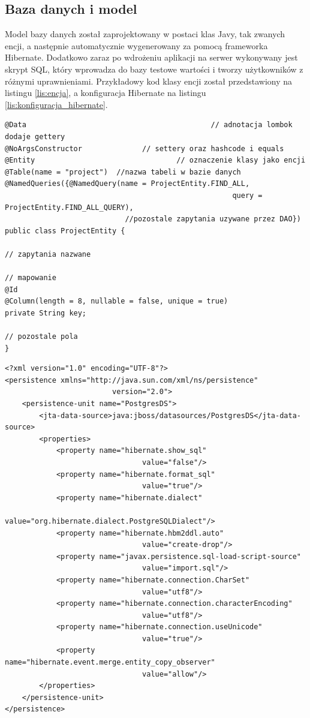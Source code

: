 \subsection{Baza danych i model}
Model bazy danych został zaprojektowany w postaci klas Javy, tak zwanych encji, a następnie automatycznie wygenerowany za pomocą frameworka Hibernate. Dodatkowo zaraz po wdrożeniu aplikacji na serwer wykonywany jest skrypt SQL, który wprowadza do bazy testowe wartości i tworzy użytkowników z różnymi uprawnieniami. Przykładowy kod klasy encji został przedstawiony na listingu \ref{lis:encja}, a konfiguracja Hibernate na listingu \ref{lis:konfiguracja_hibernate}.

\begin{lstlisting}[caption={Przykładowa klasa encji}, label=lis:encja, numbers=none]
@Data									 		// adnotacja lombok dodaje gettery
@NoArgsConstructor 				// settery oraz hashcode i equals
@Entity				  	 		 		// oznaczenie klasy jako encji
@Table(name = "project")  //nazwa tabeli w bazie danych
@NamedQueries({@NamedQuery(name = ProjectEntity.FIND_ALL, 
													 query = ProjectEntity.FIND_ALL_QUERY),
   							//pozostale zapytania uzywane przez DAO})
public class ProjectEntity {

// zapytania nazwane

// mapowanie
@Id
@Column(length = 8, nullable = false, unique = true)
private String key;

// pozostale pola
}\end{lstlisting}
\newpage
\begin{lstlisting}[caption={Konfiguracja Hibernate}, label=lis:konfiguracja_hibernate, numbers=none]
<?xml version="1.0" encoding="UTF-8"?>
<persistence xmlns="http://java.sun.com/xml/ns/persistence"
					 	 version="2.0">
	<persistence-unit name="PostgresDS">
		<jta-data-source>java:jboss/datasources/PostgresDS</jta-data-source>
		<properties>
			<property name="hibernate.show_sql" 
								value="false"/>
			<property name="hibernate.format_sql" 
								value="true"/>
			<property name="hibernate.dialect" 
								value="org.hibernate.dialect.PostgreSQLDialect"/>
			<property name="hibernate.hbm2ddl.auto" 
								value="create-drop"/>
			<property name="javax.persistence.sql-load-script-source" 
								value="import.sql"/>
			<property name="hibernate.connection.CharSet" 
								value="utf8"/>
			<property name="hibernate.connection.characterEncoding" 
								value="utf8"/>
			<property name="hibernate.connection.useUnicode" 
								value="true"/>
			<property name="hibernate.event.merge.entity_copy_observer" 
								value="allow"/>
		</properties>
	</persistence-unit>
</persistence>\end{lstlisting}

